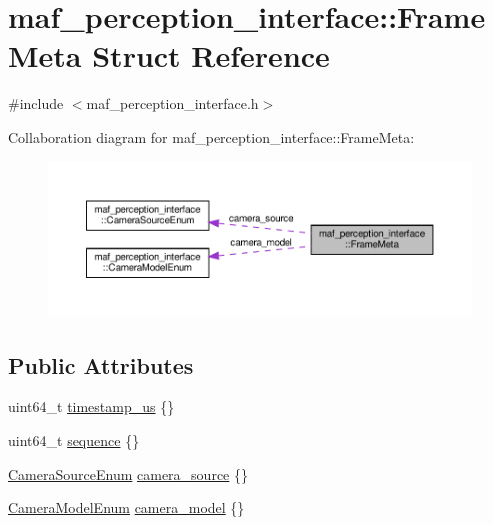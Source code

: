 \hypertarget{structmaf__perception__interface_1_1FrameMeta}{}\section{maf\+\_\+perception\+\_\+interface\+:\+:Frame\+Meta Struct Reference}
\label{structmaf__perception__interface_1_1FrameMeta}


{\ttfamily \#include $<$maf\+\_\+perception\+\_\+interface.\+h$>$}



Collaboration diagram for maf\+\_\+perception\+\_\+interface\+:\+:Frame\+Meta\+:\nopagebreak
\begin{figure}[H]
\begin{center}
\leavevmode
\includegraphics[width=350pt]{structmaf__perception__interface_1_1FrameMeta__coll__graph}
\end{center}
\end{figure}
\subsection*{Public Attributes}
\begin{DoxyCompactItemize}
\item 
uint64\+\_\+t \hyperlink{structmaf__perception__interface_1_1FrameMeta_a30435302cfbe6a9d95e79ef1a7b26f26}{timestamp\+\_\+us} \{\}
\item 
uint64\+\_\+t \hyperlink{structmaf__perception__interface_1_1FrameMeta_a31782e81a9720009c292fad865ae7227}{sequence} \{\}
\item 
\hyperlink{structmaf__perception__interface_1_1CameraSourceEnum}{Camera\+Source\+Enum} \hyperlink{structmaf__perception__interface_1_1FrameMeta_ad7a297424b999a43d54fc21b8716362f}{camera\+\_\+source} \{\}
\item 
\hyperlink{structmaf__perception__interface_1_1CameraModelEnum}{Camera\+Model\+Enum} \hyperlink{structmaf__perception__interface_1_1FrameMeta_ad90de6cbe8e3571be55c813675007a77}{camera\+\_\+model} \{\}
\end{DoxyCompactItemize}


